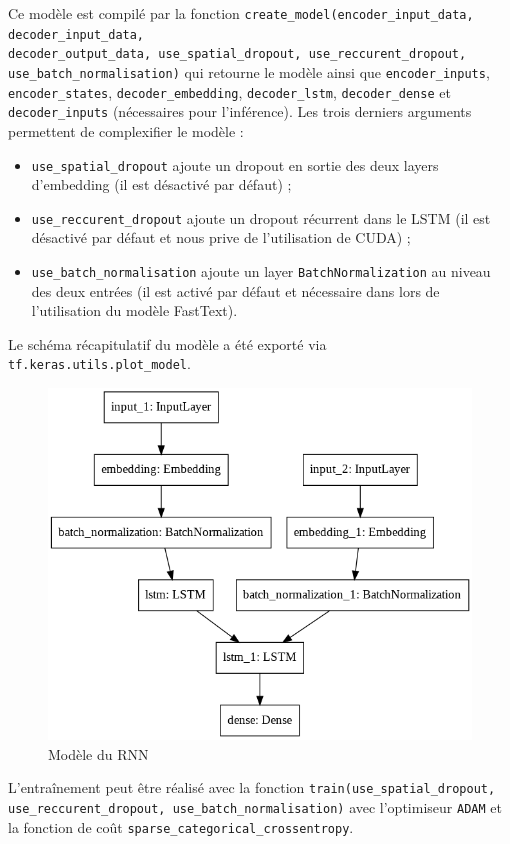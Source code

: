 \documentclass[10pt,a4paper]{article}
\begin{document}
Ce modèle est compilé par la fonction \texttt{create\_model(encoder\_input\_data, decoder\_input\_data, \\ decoder\_output\_data, use\_spatial\_dropout, use\_reccurent\_dropout, use\_batch\_normalisation)} qui retourne le modèle ainsi que \texttt{encoder\_inputs}, \texttt{encoder\_states}, \texttt{decoder\_embedding}, \texttt{decoder\_lstm}, \texttt{decoder\_dense} et \texttt{decoder\_inputs} (nécessaires pour l'inférence). Les trois derniers arguments permettent de complexifier le modèle :
\begin{itemize}
\item \texttt{use\_spatial\_dropout} ajoute un dropout en sortie des deux layers d'embedding (il est désactivé par défaut) ;
\item \texttt{use\_reccurent\_dropout} ajoute un dropout récurrent dans le LSTM (il est désactivé par défaut et nous prive de l'utilisation de CUDA) ; 
\item \texttt{use\_batch\_normalisation} ajoute un layer \texttt{BatchNormalization} au niveau des deux entrées (il est activé par défaut et nécessaire dans lors de l'utilisation du modèle FastText).
\end{itemize}
Le schéma récapitulatif du modèle a été exporté via \texttt{tf.keras.utils.plot\_model}.
\begin{figure}
\centering
\includegraphics[scale=0.5]{model.png}
\caption{Modèle du RNN}
\end{figure}
L'entraînement peut être réalisé avec la fonction \texttt{train(use\_spatial\_dropout, use\_reccurent\_dropout, use\_batch\_normalisation)} avec l'optimiseur \texttt{ADAM} et la fonction de coût \texttt{sparse\_categorical\_crossentropy}.
\end{document}
